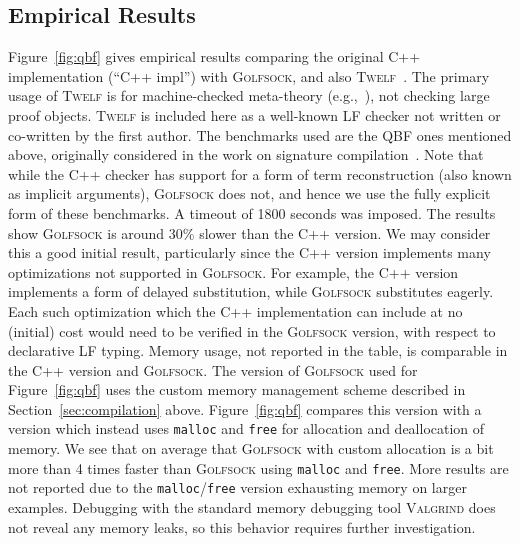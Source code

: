\documentclass[9pt,natbib]{sigplanconf}
\begin{document}
\subsection{Empirical Results}

Figure~\ref{fig:qbf} gives empirical results comparing the original
C++ implementation (``C++ impl'') with \textsc{Golfsock}, and also
\textsc{Twelf}~\cite{PfS98}.  The primary usage of \textsc{Twelf} is
for machine-checked meta-theory (e.g.,~\cite{lee+07}), not checking
large proof objects.  \textsc{Twelf} is included here as a well-known
LF checker not written or co-written by the first author.  The
benchmarks used are the QBF ones mentioned above, originally
considered in the work on signature compilation~\cite{zeller07}.  Note
that while the C++ checker has support for a form of term
reconstruction (also known as implicit arguments), \textsc{Golfsock}
does not, and hence we use the fully explicit form of these
benchmarks.  A timeout of 1800 seconds was imposed.  The results show
\textsc{Golfsock} is around 30\% slower than the C++ version.  We may
consider this a good initial result, particularly since the C++
version implements many optimizations not supported in
\textsc{Golfsock}.  For example, the C++ version implements a form of
delayed substitution, while \textsc{Golfsock} substitutes eagerly.
Each such optimization which the C++ implementation can include at no
(initial) cost would need to be verified in the \textsc{Golfsock}
version, with respect to declarative LF typing.  Memory usage, not
reported in the table, is comparable in the C++ version and
\textsc{Golfsock}.  The version of \textsc{Golfsock} used for
Figure~\ref{fig:qbf} uses the custom memory management scheme
described in Section~\ref{sec:compilation} above.
Figure~\ref{fig:qbf} compares this version with a version which
instead uses \texttt{malloc} and \texttt{free} for allocation and
deallocation of memory.  We see that on average that \textsc{Golfsock}
with custom allocation is a bit more than 4 times faster than
\textsc{Golfsock} using \texttt{malloc} and \texttt{free}.  More
results are not reported due to the \texttt{malloc}/\texttt{free}
version exhausting memory on larger examples.  Debugging with the
standard memory debugging tool \textsc{Valgrind} does not reveal any
memory leaks, so this behavior requires further investigation.
\end{document}
